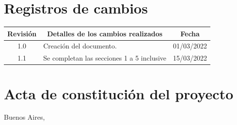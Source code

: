 \documentclass[
11pt, %
codirector, %
]{charter}
\begin{document}
\maketitle
\thispagestyle{empty}
\pagebreak


\thispagestyle{empty}
{\setlength{\parskip}{0pt}
\tableofcontents{}
}
\pagebreak


\section*{Registros de cambios}
\label{sec:registro}


\begin{table}[ht]
\label{tab:registro}
\centering
\begin{tabularx}{\linewidth}{@{}|c|X|c|@{}}
\hline
\rowcolor[HTML]{C0C0C0} 
Revisión & \multicolumn{1}{c|}{\cellcolor[HTML]{C0C0C0}Detalles de los cambios realizados} & Fecha      \\ \hline
1.0	& Creación del documento.						& 01/03/2022 \\ \hline
1.1	& Se completan las secciones 1 a 5 inclusive			& 15/03/2022 \\ \hline
\end{tabularx}
\end{table}

\pagebreak



\section*{Acta de constitución del proyecto}
\label{sec:acta}

\begin{flushright}
Buenos Aires, \fechaInicioName
\end{flushright}

\vspace{2cm}
\end{document}
